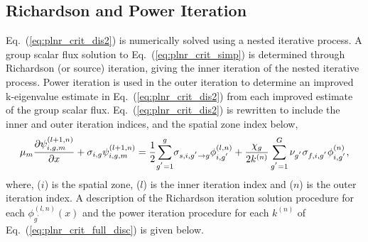 \subsection{Richardson and Power Iteration}
\label{sec:Transport-RichPow}

\noindent
	\indent Eq.~(\ref{eq:plnr_crit_dis2}) is numerically solved using a nested iterative process.  A
	group scalar flux solution to Eq.~(\ref{eq:plnr_crit_simp}) is determined through Richardson (or
	source) iteration, giving the inner iteration of the nested iterative process.  Power iteration is
	used in the outer iteration to determine an improved k-eigenvalue estimate in
	Eq.~(\ref{eq:plnr_crit_dis2}) from each improved estimate of the group scalar flux.
	Eq.~(\ref{eq:plnr_crit_dis2}) is rewritten to include the inner and outer iteration indices, and the
	spatial zone index below,
	\begin{equation}
		\mu_{m}\frac{\partial{{\psi}_{i,g,m}^{\left({l+1},{n}\right)}}}{\partial{x}}+
		{\sigma}_{i,g}{{\psi}_{i,g,m}^{\left({l+1},{n}\right)}} = 
		\frac{1}{2}{\sum^{g}_{g^{'}=1}}
		{\sigma}_{s,i,g^{'}\rightarrow{g}}{{\phi}_{i,g^{'}}^{\left({l},{n}
		\right)}}+  \\ \frac{\chi_g}{2{k^{\left({n}\right)}}}\sum^{G}_{g^{'}=
		1}\nu_{g^{'}}\sigma_{f,i,g^{'}}{{\phi}_{i,g^{'}}^{\left(n\right)}},
	\label{eq:plnr_crit_full_disc}
	\end{equation}
	where, (${i}$) is the spatial zone, (${l}$) is the inner iteration index and
	(${n}$) is the outer iteration index.  A description of the Richardson iteration
	solution procedure for each ${{{\phi}_{g^{'}}^{\left({l},{n}\right)}}({x})}$ and the power
	iteration procedure for each ${k^{\left( {n} \right)}}$ of Eq.~(\ref{eq:plnr_crit_full_disc})
	is given below.
	
